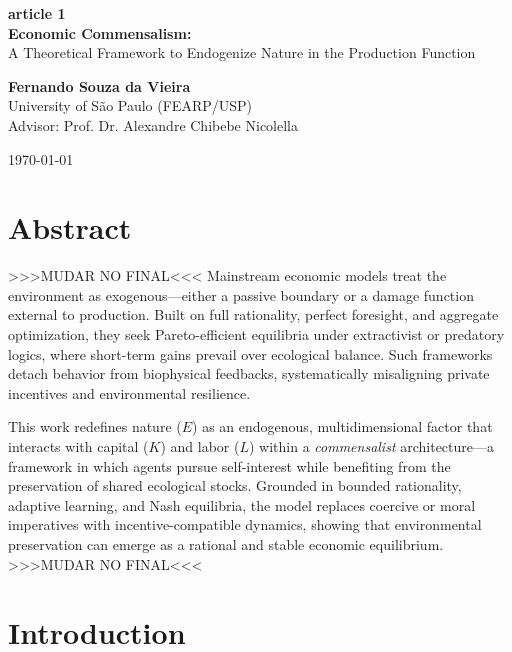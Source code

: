 \documentclass[a4paper,12pt,oneside,brazil,english]{abntex2}
\begin{document}
\begin{center}
    \vspace*{2cm}
    {\Huge \bfseries article 1}\\[1cm]
    {\Huge \bfseries Economic Commensalism:}\\[0.5cm]
    {\LARGE A Theoretical Framework to Endogenize Nature in the Production Function}
    \vspace{3cm}

    {\large \textbf{Fernando Souza da Vieira}}\\[0.3cm]
    {\large University of S\~ao Paulo (FEARP/USP)}\\[0.3cm]
    {\large Advisor: Prof. Dr. Alexandre Chibebe Nicolella}

    \vfill
    {\large \today}
\end{center}
\clearpage

\setcounter{page}{1}
\pagestyle{fancy}

\section*{Abstract}
\vspace{0.5cm}
\noindent
>>>MUDAR NO FINAL<<< Mainstream economic models treat the environment as exogenous---either a passive boundary or a damage function external to production. Built on full rationality, perfect foresight, and aggregate optimization, they seek Pareto-efficient equilibria under extractivist or predatory logics, where short-term gains prevail over ecological balance. Such frameworks detach behavior from biophysical feedbacks, systematically misaligning private incentives and environmental resilience.

This work redefines nature ($E$) as an endogenous, multidimensional factor that interacts with capital ($K$) and labor ($L$) within a \textit{commensalist} architecture---a framework in which agents pursue self-interest while benefiting from the preservation of shared ecological stocks. Grounded in bounded rationality, adaptive learning, and Nash equilibria, the model replaces coercive or moral imperatives with incentive-compatible dynamics, showing that environmental preservation can emerge as a rational and stable economic equilibrium. >>>MUDAR NO FINAL<<< 

\section{Introduction}
\end{document}

